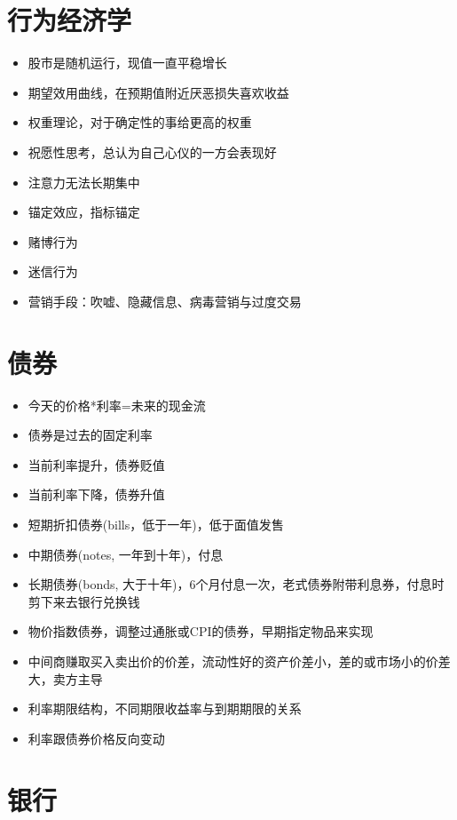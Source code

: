 \documentclass[]{book}
\providecommand{\tightlist}{%
  \setlength{\itemsep}{0pt}\setlength{\parskip}{0pt}}
\begin{document}
\hypertarget{ux884cux4e3aux7ecfux6d4eux5b66}{%
\section{行为经济学}\label{ux884cux4e3aux7ecfux6d4eux5b66}}

\begin{itemize}
\tightlist
\item
  股市是随机运行，现值一直平稳增长
\item
  期望效用曲线，在预期值附近厌恶损失喜欢收益
\item
  权重理论，对于确定性的事给更高的权重
\item
  祝愿性思考，总认为自己心仪的一方会表现好
\item
  注意力无法长期集中
\item
  锚定效应，指标锚定
\item
  赌博行为
\item
  迷信行为
\item
  营销手段：吹嘘、隐藏信息、病毒营销与过度交易
\end{itemize}

\hypertarget{ux503aux5238}{%
\section{债券}\label{ux503aux5238}}

\begin{itemize}
\tightlist
\item
  今天的价格*利率=未来的现金流
\item
  债券是过去的固定利率
\item
  当前利率提升，债券贬值
\item
  当前利率下降，债券升值
\item
  短期折扣债券(bills，低于一年)，低于面值发售
\item
  中期债券(notes, 一年到十年)，付息
\item
  长期债券(bonds, 大于十年)，6个月付息一次，老式债券附带利息券，付息时剪下来去银行兑换钱
\item
  物价指数债券，调整过通胀或CPI的债券，早期指定物品来实现
\item
  中间商赚取买入卖出价的价差，流动性好的资产价差小，差的或市场小的价差大，卖方主导
\item
  利率期限结构，不同期限收益率与到期期限的关系
\item
  利率跟债券价格反向变动
\end{itemize}

\hypertarget{ux94f6ux884c}{%
\section{银行}\label{ux94f6ux884c}}
\end{document}
